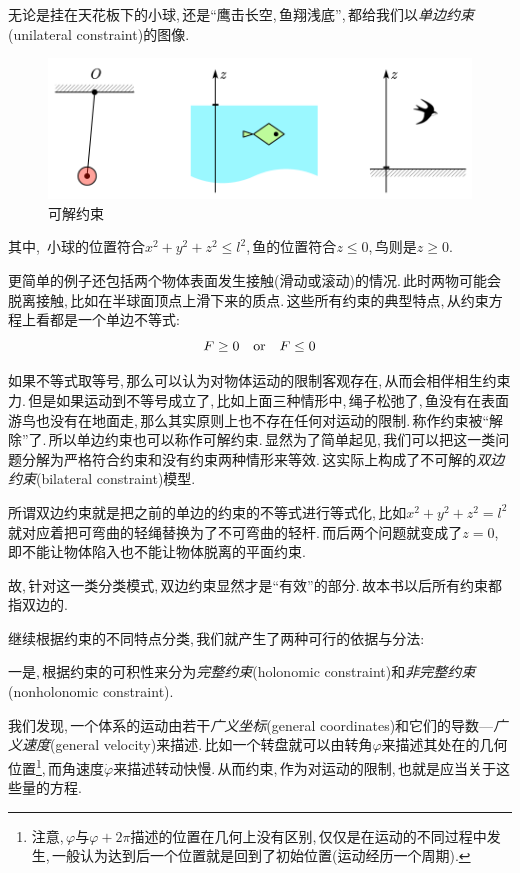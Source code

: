 无论是挂在天花板下的小球,\,还是``鹰击长空,\,鱼翔浅底'',\,都给我们以\emph{单边约束}(unilateral constraint)的图像.
\begin{figure}[H]
\centering
\includegraphics[width=14cm]{image/6-2-1.png}
\caption{可解约束}
\end{figure}

其中,\,	小球的位置符合$x^2+y^2+z^2\leq l^2$,\,鱼的位置符合$z\leq 0$,\,鸟则是$z\geq 0$.

更简单的例子还包括两个物体表面发生接触(滑动或滚动)的情况.\,此时两物可能会脱离接触,\,比如在半球面顶点上滑下来的质点.\,这些所有约束的典型特点,\,从约束方程上看都是一个单边不等式:
\[F\geq 0\quad {\rm or}\quad F\leq 0\]

如果不等式取等号,\,那么可以认为对物体运动的限制客观存在,\,从而会相伴相生约束力.\,但是如果运动到不等号成立了,\,比如上面三种情形中,\,绳子松弛了,\,鱼没有在表面游鸟也没有在地面走,\,那么其实原则上也不存在任何对运动的限制.\,称作约束被``解除''了.\,所以单边约束也可以称作可解约束.\,显然为了简单起见,\,我们可以把这一类问题分解为严格符合约束和没有约束两种情形来等效.\,这实际上构成了不可解的\emph{双边约束}(bilateral constraint)模型.

所谓双边约束就是把之前的单边的约束的不等式进行等式化,\,比如$x^2+y^2+z^2= l^2$就对应着把可弯曲的轻绳替换为了不可弯曲的轻杆.\,而后两个问题就变成了$z=0$,\,即不能让物体陷入也不能让物体脱离的平面约束.

故,\,针对这一类分类模式,\,双边约束显然才是``有效''的部分.\,故本书以后所有约束都指双边的.

继续根据约束的不同特点分类,\,我们就产生了两种可行的依据与分法:

一是,\,根据约束的可积性来分为\emph{完整约束}(holonomic constraint)和\emph{非完整约束}(nonholonomic constraint).

我们发现,\,一个体系的运动由若干\emph{广义坐标}(general coordinates)和它们的导数---\emph{广义速度}(general velocity)来描述.\,比如一个转盘就可以由转角$\varphi$来描述其处在的几何位置\footnote{注意,\,$\varphi$与$\varphi+2\pi$描述的位置在几何上没有区别,\,仅仅是在运动的不同过程中发生,\,一般认为达到后一个位置就是回到了初始位置(运动经历一个周期).},\,而角速度$\dot{\varphi}$来描述转动快慢.\,从而约束,\,作为对运动的限制,\,也就是应当关于这些量的方程.

